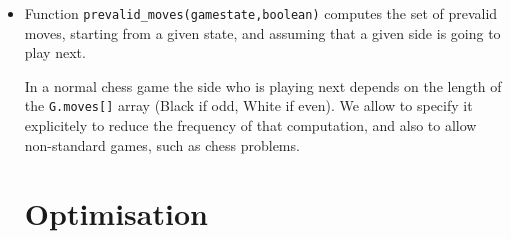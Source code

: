 \begin{itemize}
\item Function \verb+prevalid_moves(gamestate,boolean)+ computes the
  set of prevalid moves, starting from a given state, and assuming
  that a given side is going to play next.
  \begin{rem}
    In a normal chess game the side who is playing next depends on the
    length of the \verb+G.moves[]+ array (Black if odd, White if
    even). We allow to specify it explicitely to reduce the frequency
    of that computation, and also to allow non-standard games, such as
    chess problems.
  \end{rem}


\section{Optimisation}



\end{itemize}

